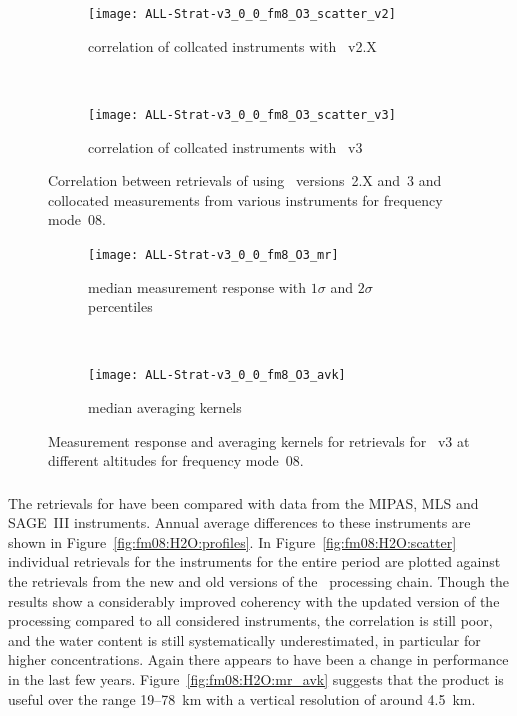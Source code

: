 \begin{figure}[tbhp]
    \centering
    \begin{subfigure}[b]{0.49\textwidth}
        \texttt{[image: ALL-Strat-v3\_0\_0\_fm8\_O3\_scatter\_v2]}
        \caption{correlation of collcated instruments with \smr~v2.X}
        \label{fig:fm08:O3:scatter:v2}
    \end{subfigure}
    \,
    \begin{subfigure}[b]{0.49\textwidth}
        \texttt{[image: ALL-Strat-v3\_0\_0\_fm8\_O3\_scatter\_v3]}
        \caption{correlation of collcated instruments with \smr~v3}
        \label{fig:fm08:O3:scatter:v3}
    \end{subfigure}
    \caption{Correlation between retrievals of  using \smr\
    versions~2.X and~3 and collocated measurements from various instruments
    for frequency mode~08.}
    \label{fig:fm08:O3:scatter}
\end{figure}

\begin{figure}[tbhp]
    \centering
    \begin{subfigure}[b]{0.49\textwidth}
        \texttt{[image: ALL-Strat-v3\_0\_0\_fm8\_O3\_mr]}
        \caption{median measurement response with $1\sigma$ and $2\sigma$
        percentiles}
        \label{fig:fm08:O3:mr}
    \end{subfigure}
    \,
    \begin{subfigure}[b]{0.49\textwidth}
        \texttt{[image: ALL-Strat-v3\_0\_0\_fm8\_O3\_avk]}
        \caption{median averaging kernels\newline~}
        \label{fig:fm08:O3:avk}
    \end{subfigure}
    \caption{Measurement response and averaging kernels for 
    retrievals for \smr~v3 at different altitudes for frequency mode~08.}
    \label{fig:fm08:O3:mr_avk}
\end{figure}


\newpage
\subsubsection{}
\label{sec:fm08:comparison:H2O}
The retrievals for \chem{H_2O} have been compared with data from the MIPAS,
MLS and SAGE~III instruments. Annual average differences to these instruments
are shown in Figure~\ref{fig:fm08:H2O:profiles}. In
Figure~\ref{fig:fm08:H2O:scatter} individual retrievals for the instruments for
the entire period are plotted against the retrievals from the new and old
versions of the \smr\ processing chain. Though the results show a considerably
improved coherency with the updated version of the processing compared to all
considered instruments, the correlation is still poor, and the water content is
still systematically underestimated, in particular for higher concentrations. Again there
appears to have been a change in performance in the last few years.
Figure~\ref{fig:fm08:H2O:mr_avk} suggests that the product is useful over the
range 19--78~km with a vertical resolution of around 4.5~km.

